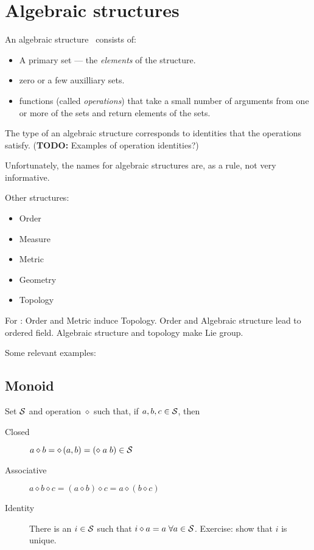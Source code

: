 \section{Algebraic structures}
\label{sec:Algebraic-structures}

An algebraic 
structure~\cite{
wiki:Algebraic-structure,
wiki:Mathematical-structure,
wiki:Outline-of-algebraic-structures}
consists of:
\begin{itemize}
  \item A primary set --- the \textit{elements} of the structure.
  \item zero or a few auxilliary sets.
  \item functions (called \textit{operations})
that take a small number of arguments from one or more of the sets
and return elements of the sets.
\end{itemize}

The type of an algebraic structure corresponds to identities
that the operations satisfy.
(\textbf{TODO:} Examples of operation identities?)

Unfortunately, the names for algebraic structures 
are, as a rule, not very informative.


Other structures:
\begin{itemize}
  \item Order
  \item Measure
  \item Metric
  \item Geometry
  \item Topology
\end{itemize}

For :
Order and Metric induce Topology.
Order and Algebraic structure lead to ordered field.
Algebraic structure and topology make Lie group.

Some relevant examples:

\subsection{Monoid}

Set ${\mathcal{S}}$ and operation $\diamond$ such that,
if $a, b, c \in {\mathcal{S}}$, then
\begin{description}
\item[Closed] $a \diamond b = \diamond \left( a, b \right) 
= \left( \diamond \; a \; b \right) \in {\mathcal{S}}$
\item[Associative] $a \diamond b \diamond c =
 \left( a \diamond b \right) \diamond c =  
 a \diamond \left( b \diamond c \right) $
 \item[Identity] There is an $i \in {\mathcal{S}}$ such that 
 $i \diamond a = a \; \forall a \in {\mathcal{S}}$.
 Exercise: show that $i$ is unique.
 \end{description}


